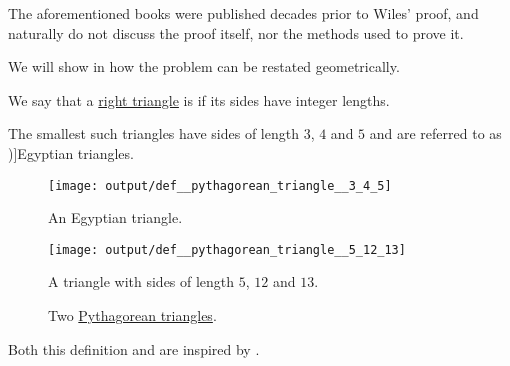 \begin{remark}
  The aforementioned books were published decades prior to Wiles' proof, and naturally do not discuss the proof itself, nor the methods used to prove it.

  We will show in  how the problem can be restated geometrically.
\end{remark}

\begin{definition}\label{def:pythagorean_triangle}
  We say that a \hyperref[def:triangle/right]{right triangle} is  if its sides have integer lengths.

  The smallest such triangles have sides of length \( 3 \), \( 4 \) and \( 5 \) and are referred to as \term[en=Egyptian triangle (\cite[\S 4.3.1]{Deza2012FigurateNumbers})]{Egyptian triangles}.

  \begin{figure}[!ht]
    \begin{subcaptionblock}[t]{0.40\textwidth}
      \centering
      \texttt{[image: output/def\_\_pythagorean\_triangle\_\_3\_4\_5]}
      \caption{An Egyptian triangle.}\label{fig:def:pythagorean_triangle/3_4_5}
    \end{subcaptionblock}
    \hfill
    \begin{subcaptionblock}[t]{0.55\textwidth}
      \centering
      \texttt{[image: output/def\_\_pythagorean\_triangle\_\_5\_12\_13]}
      \caption{A triangle with sides of length \( 5 \), \( 12 \) and \( 13 \).}\label{fig:def:pythagorean_triangle/5_12_13}
    \end{subcaptionblock}
    \caption{Two \hyperref[def:pythagorean_triangle]{Pythagorean triangles}.}\label{fig:def:pythagorean_triangle/basic}
  \end{figure}
\end{definition}
\begin{comments}
  \item Both this definition and  are inspired by .
\end{comments}

